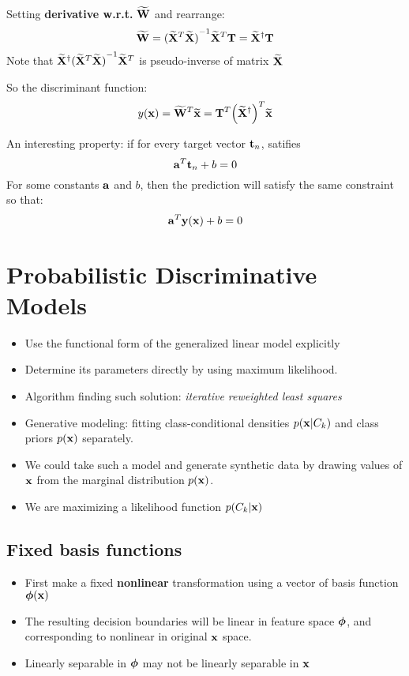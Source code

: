 Setting \textbf{derivative w.r.t.} $\widetilde{\mathbf{W}}$ and rearrange:
\begin{equation}
    \widetilde{\mathbf{W}} = {(\widetilde{\mathbf{X}}^T\widetilde{\mathbf{X}})}^{-1}\widetilde{\mathbf{X}}^T\mathbf{T}  = \widetilde{\mathbf{X}}^{\dagger}\mathbf{T}
\end{equation}
Note that $\widetilde{\mathbf{X}}^{\dagger}{(\widetilde{\mathbf{X}}^T\widetilde{\mathbf{X}})}^{-1}\widetilde{\mathbf{X}}^T$ is pseudo-inverse of matrix $\widetilde{\mathbf{X}}$

So the discriminant function:
\begin{equation}
    y(\mathbf{x}) = \widetilde{\mathbf{W}}^T\widetilde{\mathbf{x}} = \mathbf{T}^T{\left(\widetilde{\mathbf{X}}^{\dagger}\right)}^T\widetilde{\mathbf{x}}
\end{equation}

An interesting property: if for every target vector $\mathbf{t}_n$, satifies
\begin{equation}
    \mathbf{a}^T\mathbf{t}_n + b = 0
\end{equation}
For some constants $\mathbf{a}$ and $b$, then the prediction will satisfy the
same constraint so that:
\begin{equation}
    \mathbf{a}^T \mathbf{y}(\mathbf{x}) + b = 0
\end{equation}

\section{Probabilistic Discriminative Models}
\begin{itemize}
    \item Use the functional form of the generalized linear model
        explicitly
    \item Determine its parameters directly by using maximum likelihood.
    \item Algorithm finding such solution: \emph{iterative reweighted least squares}

    \item Generative modeling: fitting class-conditional densities
        $p(\mathbf{x}|C_k)$ and class priors $p(\mathbf{x})$ separately.
    \item We could take such a model and generate synthetic data by
        drawing values of $\mathbf{x}$ from the marginal distribution $p(\mathbf{x})$.
    \item We are maximizing a likelihood function $p(C_k|\mathbf{x})$
\end{itemize}

\subsection{Fixed basis functions}
\begin{itemize}
    \item First make a fixed \textbf{nonlinear} transformation using a
        vector of basis function $\boldsymbol\phi(\mathbf{x})$
    \item The resulting decision boundaries will be linear in feature
        space $\boldsymbol\phi$, and corresponding to nonlinear in original $\mathbf{x}$
        space.
    \item Linearly separable in $\boldsymbol\phi$ may not be linearly separable in
        $\mathbf{x}$
\end{itemize}

